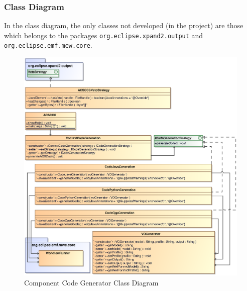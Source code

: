 \newpage

\subsubsection{Class Diagram}
In the class diagram, the only classes not developed (in the project) are those
which belongs to the packages {\tt org.eclipse.xpand2.output}  and {\tt
org.eclipse.emf.mew.core}.\\ 
\begin{figure}[h!t]
\begin{center}
\includegraphics[scale=0.85]{images/ccgclassdiagram}
\caption{\label{fig:main_diag}Component Code Generator Class Diagram}
\end{center}
\end{figure}

\newpage

